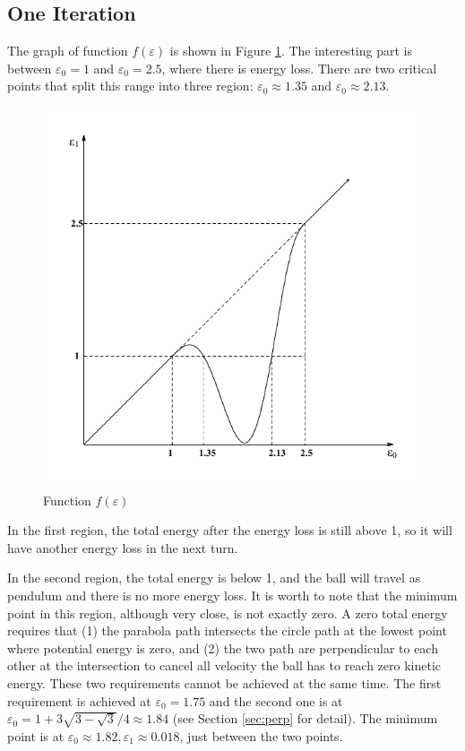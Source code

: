 \documentclass[]{article}
\begin{document}
\subsection{One Iteration}

The graph of function $f(\varepsilon)$ is shown in Figure \ref{fig:f1}. The interesting part is between $\varepsilon_0 = 1$ and $\varepsilon_0=2.5$, where there is energy loss. There are two critical points that split this range into three region: $\varepsilon_0 \approx 1.35$ and $\varepsilon_0 \approx 2.13$.

\begin{figure}[!h]
	\centering
	\includegraphics[scale=1]{f1.pdf}
	\caption{Function $f(\varepsilon)$}
	\label{fig:f1}
\end{figure}

In the first region, the total energy after the energy loss is still above 1, so it will have another energy loss in the next turn. 

In the second region, the total energy is below 1, and the ball will travel as pendulum and there is no more energy loss. It is worth to note that the minimum point in this region, although very close, is not exactly zero. A zero total energy requires that (1) the parabola path intersects the circle path at the lowest point where potential energy is zero, and (2) the two path are perpendicular to each other at the intersection to cancel all velocity the ball has to reach zero kinetic energy. These two requirements cannot be achieved at the same time. The first requirement is achieved at $\varepsilon_0 = 1.75$ and the second one is at $\varepsilon_0 = 1+3\sqrt{3-\sqrt{3}}/4 \approx 1.84$ (see Section \ref{sec:perp} for detail). The minimum point is at $\varepsilon_0 \approx 1.82, \varepsilon_1 \approx 0.018$, just between the two points.
\end{document}
